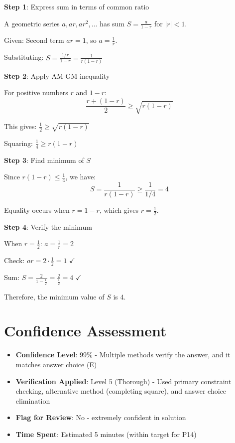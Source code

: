 \documentclass[12pt]{article}
\begin{document}
\textbf{Step 1}: Express sum in terms of common ratio

A geometric series $a, ar, ar^2, \ldots$ has sum $S = \frac{a}{1-r}$ for $|r| < 1$.

Given: Second term $ar = 1$, so $a = \frac{1}{r}$.

Substituting: $S = \frac{1/r}{1-r} = \frac{1}{r(1-r)}$

\textbf{Step 2}: Apply AM-GM inequality

For positive numbers $r$ and $1-r$:
\[\frac{r + (1-r)}{2} \geq \sqrt{r(1-r)}\]

This gives: $\frac{1}{2} \geq \sqrt{r(1-r)}$

Squaring: $\frac{1}{4} \geq r(1-r)$

\textbf{Step 3}: Find minimum of $S$

Since $r(1-r) \leq \frac{1}{4}$, we have:
\[S = \frac{1}{r(1-r)} \geq \frac{1}{1/4} = 4\]

Equality occurs when $r = 1-r$, which gives $r = \frac{1}{2}$.

\textbf{Step 4}: Verify the minimum

When $r = \frac{1}{2}$: $a = \frac{1}{r} = 2$

Check: $ar = 2 \cdot \frac{1}{2} = 1$ $\checkmark$

Sum: $S = \frac{2}{1-\frac{1}{2}} = \frac{2}{\frac{1}{2}} = 4$ $\checkmark$

Therefore, the minimum value of $S$ is $\boxed{4}$.

\section*{Confidence Assessment}
\begin{itemize}[leftmargin=*]
    \item \textbf{Confidence Level}: 99\% - Multiple methods verify the answer, and it matches answer choice (E)
    \item \textbf{Verification Applied}: Level 5 (Thorough) - Used primary constraint checking, alternative method (completing square), and answer choice elimination
    \item \textbf{Flag for Review}: No - extremely confident in solution
    \item \textbf{Time Spent}: Estimated 5 minutes (within target for P14)
\end{itemize}
\end{document}

